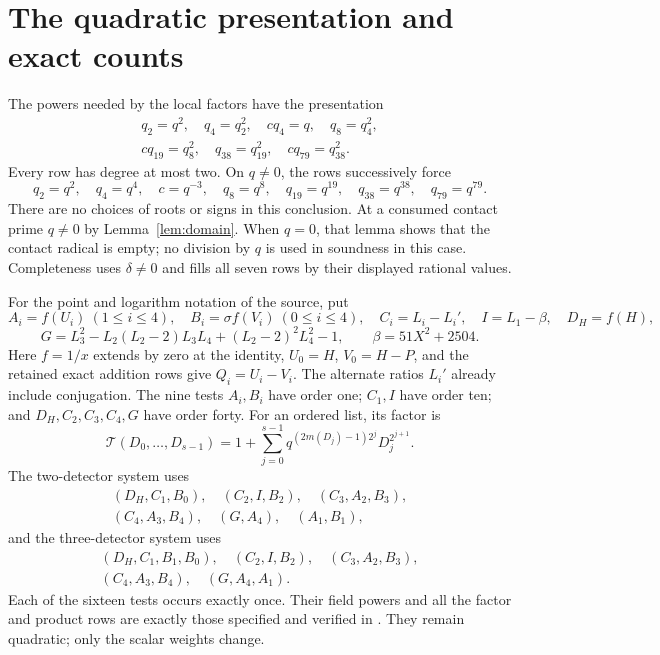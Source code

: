 \documentclass[11pt,a4paper]{article}
\theoremstyle{remark}\newtheorem{remark}[theorem]{Remark}
\begin{document}
\section{The quadratic presentation and exact counts}
The powers needed by the local factors have the presentation
\begin{equation}\label{eq:chain}
 \begin{gathered}
 q_2=q^2,\quad q_4=q_2^2,\quad cq_4=q,\quad q_8=q_4^2,\\
 cq_{19}=q_8^2,\quad q_{38}=q_{19}^2,\quad cq_{79}=q_{38}^2.
 \end{gathered}
\end{equation}
Every row has degree at most two. On $q\ne0$, the rows successively
force
\[
 q_2=q^2,\quad q_4=q^4,\quad c=q^{-3},\quad q_8=q^8,
 \quad q_{19}=q^{19},\quad q_{38}=q^{38},\quad q_{79}=q^{79}.
\]
There are no choices of roots or signs in this conclusion. At a consumed
contact prime $q\ne0$ by Lemma~\ref{lem:domain}. When $q=0$, that lemma
shows that the contact radical is empty; no division by $q$ is used in
soundness in this case. Completeness uses $\delta\ne0$ and fills all
seven rows by their displayed rational values.

For the point and logarithm notation of the source, put
\[
 A_i=f(U_i)\ (1\le i\le4),\quad B_i=\sigma f(V_i)\ (0\le i\le4),
 \quad C_i=L_i-L_i',\quad I=L_1-\beta,\quad D_H=f(H),
\]
\[
 G=L_3^2-L_2(L_2-2)L_3L_4+(L_2-2)^2L_4^2-1,
 \qquad \beta=51X^2+2504.
\]
Here $f=1/x$ extends by zero at the identity, $U_0=H$, $V_0=H-P$,
and the retained exact addition rows give $Q_i=U_i-V_i$. The alternate
ratios $L_i'$ already include conjugation. The nine tests $A_i,B_i$ have
order one; $C_1,I$ have order ten; and $D_H,C_2,C_3,C_4,G$ have order forty.
For an ordered list, its factor is
\[
 \mathcal T(D_0,\ldots,D_{s-1})
 =1+\sum_{j=0}^{s-1}q^{(2m(D_j)-1)2^j}D_j^{2^{j+1}}.
\]
The two-detector system uses
\[
 \begin{gathered}
 (D_H,C_1,B_0),\quad(C_2,I,B_2),\quad(C_3,A_2,B_3),\\
 (C_4,A_3,B_4),\quad(G,A_4),\quad(A_1,B_1),
 \end{gathered}
\]
and the three-detector system uses
\[
 \begin{gathered}
 (D_H,C_1,B_1,B_0),\quad(C_2,I,B_2),\quad(C_3,A_2,B_3),\\
 (C_4,A_3,B_4),\quad(G,A_4,A_1).
 \end{gathered}
\]
Each of the sixteen tests occurs exactly once. Their field powers and
all the factor and product rows are exactly those specified and verified
in \cite{Packing}. They remain quadratic; only the scalar weights change.
\end{document}
